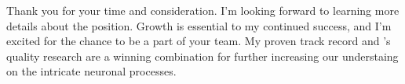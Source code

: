 



Thank you for your time and consideration. I'm looking forward to learning more details about the \position\;position.
Growth is essential to my continued success, and I'm excited for the chance to be a part of your team.
My proven track record and \company's quality research are a winning combination for further increasing our understaing on the intricate neuronal processes.
